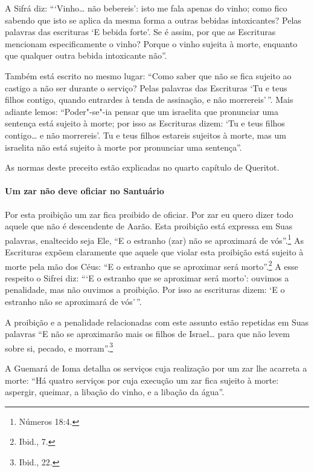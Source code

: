 \begin{multicols}{2}
A Sifrá\starr{} diz: ```Vinho\ldots{} não bebereis': isto me fala apenas do vinho;
como fico sabendo que isto se aplica da mesma forma a outras bebidas
intoxicantes? Pelas palavras das escrituras `E bebida forte'. Se é
assim, por que as Escrituras mencionam especificamente o vinho? Porque
o vinho sujeita à morte, enquanto que qualquer outra bebida intoxicante
não''.

Também está escrito no mesmo lugar: ``Como saber que não se fica sujeito
ao castigo a não ser durante o serviço? Pelas palavras das Escrituras
`Tu e teus filhos contigo, quando entrardes à tenda de assinação, e não
morrereis'\,''. Mais adiante lemos: ``Poder"-se"-ia pensar que um israelita
que pronunciar uma sentença está sujeito à morte; por isso as Escrituras
dizem: `Tu e teus filhos contigo\ldots{} e não morrereis'. Tu e teus filhos
estareis sujeitos à morte, mas um israelita não está sujeito à morte
por pronunciar uma sentença''.

As normas deste preceito estão explicadas no quarto capítulo de Queritot\starr.

\paragraph{Um zar\starr{} não deve oficiar no Santuário}

Por esta proibição um zar\starr{} fica proibido de oficiar. Por zar\starr{} eu
quero dizer todo aquele que não é descendente de Aarão. Esta proibição
está expressa em Suas palavras, enaltecido seja Ele, ``E o estranho
(zar\starr) não se aproximará de vós''.\footnote{Números 18:4.} As Escrituras expõem claramente que
aquele que violar esta proibição está sujeito à morte pela mão dos Céus:
``E o estranho que se aproximar será morto''.\footnote{Ibid., 7.} A esse respeito
o Sifrei\starr{} diz: ```E o estranho que se aproximar será morto': ouvimos a
penalidade, mas não ouvimos a proibição. Por isso as escrituras dizem:
`E o estranho não se aproximará de vós'\,''.

A proibição e a penalidade relacionadas com este assunto estão repetidas
em Suas palavras ``E não se aproximarão mais os filhos de Israel\ldots{} para
que não levem sobre si, pecado, e morram''.\footnote{Ibid., 22.}

A Guemará\starr{} de Ioma\starr{} detalha os serviços cuja realização por um zar\starr{} lhe
acarreta a morte: ``Há quatro serviços por cuja execução um zar\starr{} fica
sujeito à morte: aspergir, queimar, a libação do vinho, e a libação da
água''.


\end{multicols}
